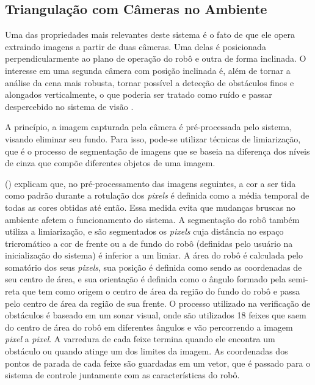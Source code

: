 \subsection{Triangulação com Câmeras no Ambiente}
\label{subsec:triangulacao}

Uma das propriedades mais relevantes deste sistema é o fato de que ele opera extraindo imagens a partir de duas câmeras. Uma delas é posicionada perpendicularmente ao plano de operação do robô e outra de forma inclinada. O interesse em uma segunda câmera com posição inclinada é, além de tornar a análise da cena mais robusta, tornar possível a detecção de obstáculos finos e alongados verticalmente, o que poderia ser tratado como ruído e passar despercebido no sistema de visão \cite{andrade2006sistema}.

A princípio, a imagem capturada pela câmera é pré-processada pelo sistema, visando eliminar seu fundo. Para isso, pode-se utilizar técnicas de limiarização, que é o processo de segmentação de imagens que se baseia na diferença dos níveis de cinza que compõe diferentes objetos de uma imagem.

\citeauthor{andrade2006sistema} (\citeyear{andrade2006sistema}) explicam que, no pré-processamento das imagens seguintes, a cor a ser tida como padrão durante a rotulação dos \textit{pixels} é definida como a média temporal de todas as cores obtidas até então. Essa medida evita que mudanças bruscas no ambiente afetem o funcionamento do sistema. A segmentação do robô também utiliza a limiarização, e são segmentados os \textit{pixels} cuja distância no espaço tricromático a cor de frente ou a de fundo do robô (definidas pelo usuário na inicialização do sistema) é inferior a um limiar. A área do robô é calculada pelo somatório dos seus \textit{pixels}, sua posição é definida como sendo as coordenadas de seu centro de área, e sua orientação é definida como o ângulo formado pela semi-reta que tem como origem o centro de área da região do fundo do robô e passa pelo centro de área da região de sua frente. O processo utilizado na verificação de obstáculos é baseado em um sonar visual, onde são utilizados 18 feixes que saem do centro de área do robô em diferentes ângulos e vão percorrendo a imagem \textit{pixel} a \textit{pixel}. A varredura de cada feixe termina quando ele encontra um obstáculo ou quando atinge um dos limites da imagem. As coordenadas dos pontos de parada de cada feixe são guardadas em um vetor, que é passado para o sistema de controle juntamente com as características do robô.

